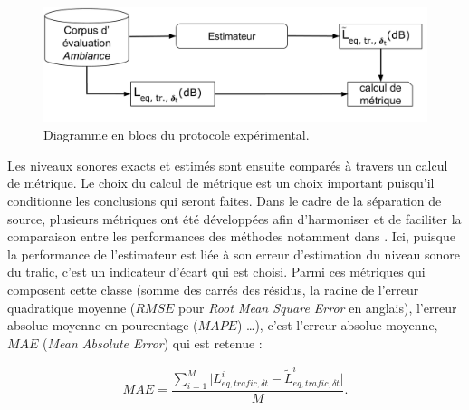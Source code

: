 \begin{figure}[ht]
\centering
\includegraphics[width=0.7\linewidth]{./figures/NMF/Bloc_diagram_estimateur_FR.pdf}
\caption{Diagramme en blocs du protocole expérimental.}
\label{fig:diagramBlocProtocol}
\end{figure}

Les niveaux sonores exacts et estimés sont ensuite comparés à travers un calcul de métrique. Le choix du calcul de métrique est un choix important puisqu'il conditionne les conclusions qui seront faites. 
Dans le cadre de la séparation de source, plusieurs métriques ont été développées afin d'harmoniser et de faciliter la comparaison entre les performances des méthodes notamment dans \cite{vincent2006performance}.
Ici, puisque la performance de l'estimateur est liée à son erreur d'estimation du niveau sonore du trafic, c'est un indicateur d'écart qui est choisi. Parmi ces métriques qui composent cette classe (somme des carrés des résidus, la racine de l'erreur quadratique moyenne ($RMSE$ pour \textit{Root Mean Square Error} en anglais), l'erreur  absolue moyenne en pourcentage ($MAPE$)  \dots), c'est l'erreur absolue moyenne, $MAE$ (\textit{Mean Absolute Error}) qui est retenue :

\begin{equation}\label{eq:mae}
MAE = \frac{\sum_{i = 1}^{M} \vert L_{eq, trafic, \delta t}^i - \tilde{L}_{eq, trafic, \delta t}^i \vert}{M}.
\end{equation}


